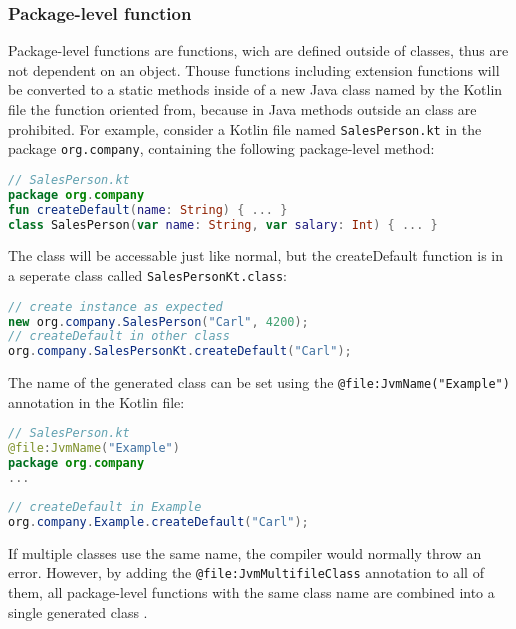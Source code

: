 \documentclass[a4paper,11pt]{article}
\begin{document}
\subsubsection{Package-level function}
Package-level functions are functions, wich are defined outside of classes, thus are not dependent on an object. Thouse functions including extension functions will be converted to a static methods inside of a new Java class \cite{interop-package-level-func} named by the Kotlin file the function oriented from, because in Java methods outside an class are prohibited. For example, consider a Kotlin file named \texttt{SalesPerson.kt} in the package \texttt{org.company}, containing the following package-level method:
\begin{lstlisting}[language=Kotlin]
// SalesPerson.kt
package org.company
fun createDefault(name: String) { ... }
class SalesPerson(var name: String, var salary: Int) { ... }
\end{lstlisting}
The class will be accessable just like normal, but the createDefault function is in a seperate class called \texttt{SalesPersonKt.class}:
\begin{lstlisting}[language=Java]
// create instance as expected
new org.company.SalesPerson("Carl", 4200);
// createDefault in other class
org.company.SalesPersonKt.createDefault("Carl");
\end{lstlisting}
The name of the generated class can be set using the \texttt{@file:JvmName("Example")} annotation in the Kotlin file:
\begin{lstlisting}[language=Kotlin]
// SalesPerson.kt
@file:JvmName("Example")
package org.company
...
\end{lstlisting}
\begin{lstlisting}[language=Java]
// createDefault in Example
org.company.Example.createDefault("Carl");
\end{lstlisting}
If multiple classes use the same name, the compiler would normally throw an error. However, by adding the \texttt{@file:JvmMultifileClass} annotation to all of them, all package-level functions with the same class name are combined into a single generated class \cite{interop-package-level-func}.
\end{document}
